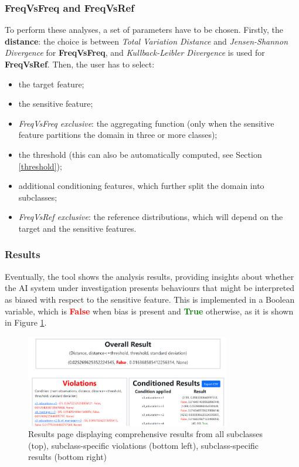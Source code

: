 \documentclass[
]{ceurart}
\begin{document}
\subsubsection{FreqVsFreq and FreqVsRef}
To perform these analyses, a set of parameters have to be chosen. Firstly, the \textbf{distance}: the choice is between \textit{Total Variation Distance} and \textit{Jensen-Shannon Divergence} for \textbf{FreqVsFreq}, and \textit{Kullback-Leibler Divergence} is used for \textbf{FreqVsRef}. Then, the user has to select: 

\begin{itemize}
  \item the target feature;
  \item the sensitive feature;
  \item \textit{FreqVsFreq exclusive}: the aggregating function (only when the sensitive feature partitions the domain in three or more classes);
  \item the threshold (this can also be automatically computed, see Section \ref{threshold});
  \item additional conditioning features, which further split the domain into subclasses;
  \item \textit{FreqVsRef exclusive}: the reference distributions, which will depend on the target and the sensitive features. 
\end{itemize}

\subsubsection{Results}
Eventually, the tool shows the analysis results, providing insights about whether the AI system under investigation presents behaviours that might be interpreted as biased with respect to the sensitive feature. This is implemented in a Boolean variable, which is \textbf{\textcolor{red}{False}} when bias is present and \textbf{\textcolor{green}{True}} otherwise, as it is shown in Figure \ref{fig:results}.

\begin{figure}[h]
  \begin{center}
    \includegraphics[width=0.8\textwidth]{frontend_results_page.png}
  \end{center}
  \caption{Results page displaying comprehensive results from all subclasses (top), subclass-specific violations (bottom left), subclass-specific results (bottom right)}
  \label{fig:results}
\end{figure}
\end{document}
